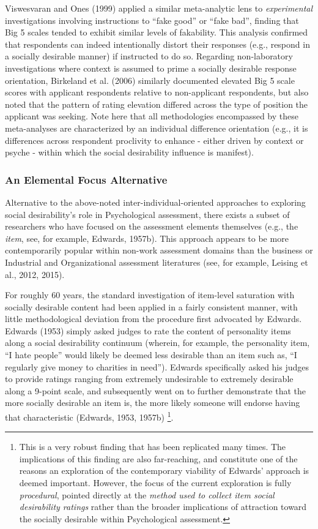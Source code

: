 \documentclass[
  ,jou]{apa6}
\begin{document}
Viswesvaran and Ones (1999) applied a similar meta-analytic lens to \emph{experimental} investigations involving instructions to ``fake good'' or ``fake bad'', finding that Big 5 scales tended to exhibit similar levels of fakability. This analysis confirmed that respondents can indeed intentionally distort their responses (e.g., respond in a socially desirable manner) if instructed to do so. Regarding non-laboratory investigations where context is assumed to prime a socially desirable response orientation, Birkeland et al. (2006) similarly documented elevated Big 5 scale scores with applicant respondents relative to non-applicant respondents, but also noted that the pattern of rating elevation differed across the type of position the applicant was seeking. Note here that all methodologies encompassed by these meta-analyses are characterized by an individual difference orientation (e.g., it is differences across respondent proclivity to enhance - either driven by context or psyche - within which the social desirability influence is manifest).

\subsubsection{An Elemental Focus Alternative}\label{an-elemental-focus-alternative}

Alternative to the above-noted inter-individual-oriented approaches to exploring social desirability's role in Psychological assessment, there exists a subset of researchers who have focused on the assessment elements themselves (e.g., the \emph{item}, see, for example, Edwards, 1957b). This approach appears to be more contemporarily popular within non-work assessment domains than the business or Industrial and Organizational assessment literatures (see, for example, Leising et al., 2012, 2015).

For roughly 60 years, the standard investigation of item-level saturation with socially desirable content had been applied in a fairly consistent manner, with little methodological deviation from the procedure first advocated by Edwards. Edwards (1953) simply asked judges to rate the content of personality items along a social desirability continuum (wherein, for example, the personality item, ``I hate people'' would likely be deemed less desirable than an item such as, ``I regularly give money to charities in need''). Edwards specifically asked his judges to provide ratings ranging from extremely undesirable to extremely desirable along a 9-point scale, and subsequently went on to further demonstrate that the more socially desirable an item is, the more likely someone will endorse having that characteristic (Edwards, 1953, 1957b) \footnote{This is a very robust finding that has been replicated many times. The implications of this finding are also far-reaching, and constitute one of the reasons an exploration of the contemporary viability of Edwards' approach is deemed important. However, the focus of the current exploration is fully \emph{procedural}, pointed directly at the \emph{method used to collect item social desirability ratings} rather than the broader implications of attraction toward the socially desirable within Psychological assessment.}.
\end{document}
